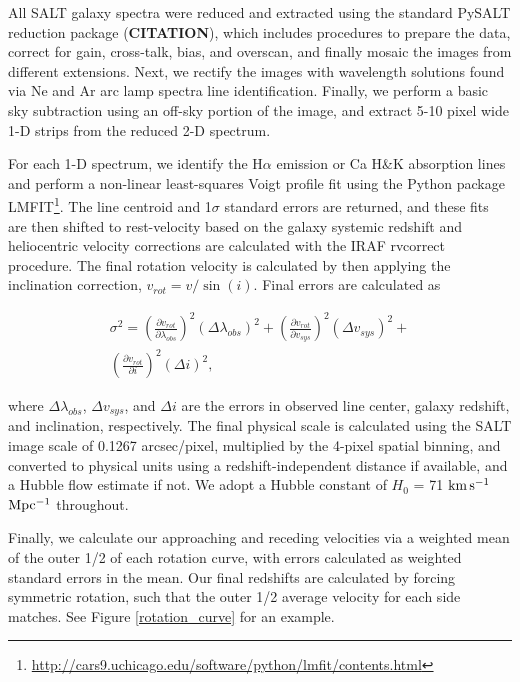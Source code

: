 \documentclass[iop]{emulateapj-rtx4}
\newcommand{\kms}{$\rm km\, s^{-1}$}
\begin{document}


All SALT galaxy spectra were reduced and extracted using the standard PySALT reduction package (\textbf{CITATION}), which includes procedures to prepare the data, correct for gain, cross-talk, bias, and overscan, and finally mosaic the images from different extensions. Next, we rectify the images with wavelength solutions found via Ne and Ar arc lamp spectra line identification. Finally, we perform a basic sky subtraction using an off-sky portion of the image, and extract 5-10 pixel wide 1-D strips from the reduced 2-D spectrum. 

For each 1-D spectrum, we identify the H$\alpha$ emission or Ca H\&K absorption lines and perform a non-linear least-squares Voigt profile fit using the Python package LMFIT\footnote{\url{http://cars9.uchicago.edu/software/python/lmfit/contents.html}}. The line centroid and 1$\sigma$ standard errors are returned, and these fits are then shifted to rest-velocity based on the galaxy systemic redshift and heliocentric velocity corrections are calculated with the IRAF rvcorrect procedure. The final rotation velocity is calculated by then applying the inclination correction, $v_{rot} = v / \sin(i)$. Final errors are calculated as

\begin{equation}
\begin{split}
	\sigma^2 = \left( \frac{\partial v_{rot}}{\partial \lambda_{obs}} \right)^2 (\Delta \lambda_{obs})^2 + \left(\frac{\partial v_{rot}}{\partial v_{sys}} \right)^2 (\Delta v_{sys})^2 + \\
	\left( \frac{\partial v_{rot}}{\partial i} \right)^2 (\Delta i)^2,
\end{split}
\end{equation}

\noindent where $\Delta \lambda_{obs}$, $\Delta v_{sys}$, and $\Delta i$ are the errors in observed line center, galaxy redshift, and inclination, respectively. The final physical scale is calculated using the SALT image scale of 0.1267 arcsec/pixel, multiplied by the 4-pixel spatial binning, and converted to physical units using a redshift-independent distance if available, and a Hubble flow estimate if not. We adopt a Hubble constant of $H_0$ = 71 \kms $\rm Mpc^{-1}$ throughout.

Finally, we calculate our approaching and receding velocities via a weighted mean of the outer 1/2 of each rotation curve, with errors calculated as weighted standard errors in the mean. Our final redshifts are calculated by forcing symmetric rotation, such that the outer 1/2 average velocity for each side matches. See Figure \ref{rotation_curve} for an example.
\end{document}
